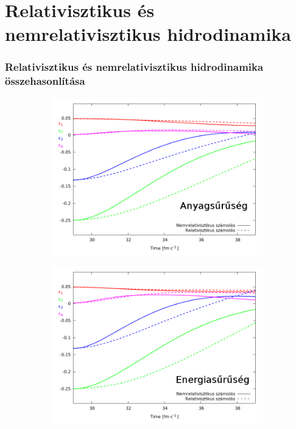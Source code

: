 \documentclass{beamer}
\begin{document}
\section{Relativisztikus és nemrelativisztikus hidrodinamika}
\begin{frame}
\frametitle{Relativisztikus és nemrelativisztikus hidrodinamika összehasonlítása}
\begin{center}
\begin{figure}[H]
	\centering
    \begin{subfigure}[b]{0.49\textwidth}
    		\includegraphics[width=\textwidth]{pic/res/relnonrel_n}
	\end{subfigure}
	\begin{subfigure}[b]{0.49\textwidth}
        	\includegraphics[width=\textwidth]{pic/res/relnonrel_e}
	\end{subfigure}
\end{figure}
\end{center}
\end{frame}
\end{document}
